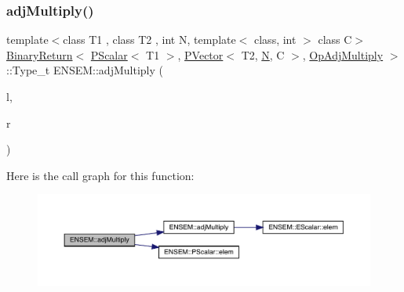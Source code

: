 \subsubsection{\texorpdfstring{adjMultiply()}{adjMultiply()}\hspace{0.1cm}{\footnotesize\ttfamily [1/2]}}
{\footnotesize\ttfamily template$<$class T1 , class T2 , int N, template$<$ class, int $>$ class C$>$ \\
\mbox{\hyperlink{structENSEM_1_1BinaryReturn}{Binary\+Return}}$<$ \mbox{\hyperlink{classENSEM_1_1PScalar}{P\+Scalar}}$<$ T1 $>$, \mbox{\hyperlink{classENSEM_1_1PVector}{P\+Vector}}$<$ T2, \mbox{\hyperlink{operator__name__util_8cc_a7722c8ecbb62d99aee7ce68b1752f337}{N}}, C $>$, \mbox{\hyperlink{structENSEM_1_1OpAdjMultiply}{Op\+Adj\+Multiply}} $>$\+::Type\+\_\+t E\+N\+S\+E\+M\+::adj\+Multiply (\begin{DoxyParamCaption}\item[{const \mbox{\hyperlink{classENSEM_1_1PScalar}{P\+Scalar}}$<$ T1 $>$ \&}]{l,  }\item[{const \mbox{\hyperlink{classENSEM_1_1PVector}{P\+Vector}}$<$ T2, \mbox{\hyperlink{operator__name__util_8cc_a7722c8ecbb62d99aee7ce68b1752f337}{N}}, C $>$ \&}]{r }\end{DoxyParamCaption})\hspace{0.3cm}{\ttfamily [inline]}}

Here is the call graph for this function\+:\nopagebreak
\begin{figure}[H]
\begin{center}
\leavevmode
\includegraphics[width=350pt]{d3/dc4/group__primvector_ga8b4f68b7aa172234ddbd8490f45bb13c_cgraph}
\end{center}
\end{figure}
\mbox{\label{group__primvector_ga1728ca784073c199bee500323e8ae96e}} 
